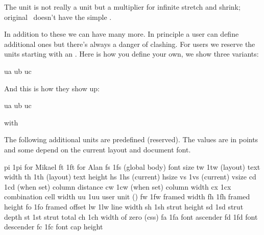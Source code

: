The  unit is not really a unit but a multiplier for infinite
stretch and shrink; original \TEX\ doesn't have the simple .

In addition to these we can have many more. In principle a user can define
additional ones but there's always a danger of clashing. For users we reserve the
units starting with an . Here is how you define your own, we show three
variants:

\startbuffer
\newdimension \FooA   \FooA 1.23pt
\newdimen     \FooB   \FooB 12.3pt
\protected\def\FooC   {\the\dimexpr\FooA +\FooB\relax}

\pushoverloadmode %
    \newuserunit\FooA ua
    \newuserunit\FooB ub
    \newuserunit\FooC uc
\popoverloadmode
\stopbuffer

\typebuffer[option=TEX] \getbuffer

And this is how they show up:

\startbuffer
\the{} ua \relax\quad
\the{} ub \relax\quad
\the{} uc \relax
\stopbuffer

\getbuffer

with

\typebuffer[option=TEX]

The following additional units are predefined (reserved). The values are in
points and some depend on the current layout and document font.

\starttabulate[|T|Tr|l|]
\NC pi \NC \thewithoutunit\dimexpr 1pi \NC {\tt\pi} for Mikael        \NC \NR
\NC ft \NC \thewithoutunit\dimexpr 1ft \NC {} for Alan      \NC \NR
\NC fs \NC \thewithoutunit\dimexpr 1fs \NC (global body) font size    \NC \NR
\NC tw \NC \thewithoutunit\dimexpr 1tw \NC (layout) text width        \NC \NR
\NC th \NC \thewithoutunit\dimexpr 1th \NC (layout) text height       \NC \NR
\NC hs \NC \thewithoutunit\dimexpr 1hs \NC (current) hsize            \NC \NR
\NC vs \NC \thewithoutunit\dimexpr 1vs \NC (current) vsize            \NC \NR
\NC cd \NC \thewithoutunit\dimexpr 1cd \NC (when set) column distance \NC \NR %
\NC cw \NC \thewithoutunit\dimexpr 1cw \NC (when set) column width    \NC \NR %
\NC cx \NC \thewithoutunit\dimexpr 1cx \NC combination cell width     \NC \NR
\NC uu \NC \thewithoutunit\dimexpr 1uu \NC user unit (\METAFUN)       \NC \NR
\NC fw \NC \thewithoutunit\dimexpr 1fw \NC framed width               \NC \NR
\NC fh \NC \thewithoutunit\dimexpr 1fh \NC framed height              \NC \NR
\NC fo \NC \thewithoutunit\dimexpr 1fo \NC framed offset              \NC \NR
\NC lw \NC \thewithoutunit\dimexpr 1lw \NC line width                 \NC \NR
\NC sh \NC \thewithoutunit\dimexpr 1sh \NC strut height               \NC \NR
\NC sd \NC \thewithoutunit\dimexpr 1sd \NC strut depth                \NC \NR
\NC st \NC \thewithoutunit\dimexpr 1st \NC strut total                \NC \NR
\NC ch \NC \thewithoutunit\dimexpr 1ch \NC width of zero (css)        \NC \NR
\NC fa \NC \thewithoutunit\dimexpr 1fa \NC font ascender              \NC \NR
\NC fd \NC \thewithoutunit\dimexpr 1fd \NC font descender             \NC \NR
\NC fc \NC \thewithoutunit\dimexpr 1fc \NC font cap height            \NC \NR
\stoptabulate

